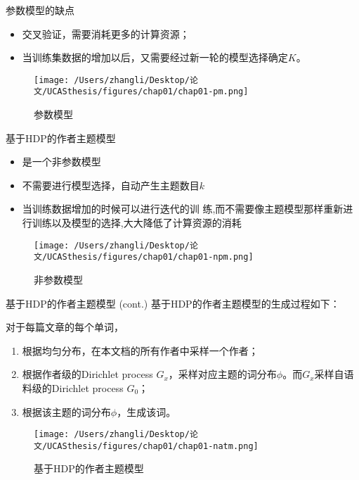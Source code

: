 \documentclass[presentation]{beamer}
\begin{document}
\begin{frame}[label={sec:orgheadline7}]{参数模型的缺点}
\begin{itemize}
\item 交叉验证，需要消耗更多的计算资源；
\item 当训练集数据的增加以后，又需要经过新一轮的模型选择确定\(K\)。
\end{itemize}
\begin{figure}[htb]
\centering
\texttt{[image: /Users/zhangli/Desktop/论文/UCASthesis/figures/chap01/chap01-pm.png]}
\caption{\label{fig:orgparagraph1}
参数模型}
\end{figure}
\end{frame}

\begin{frame}[label={sec:orgheadline8}]{基于HDP的作者主题模型}
\begin{itemize}
\item 是一个非参数模型
\item 不需要进行模型选择，自动产生主题数目\(k\)
\item 当训练数据增加的时候可以进行迭代的训 练,而不需要像主题模型那样重新进行训练以及模型的选择,大大降低了计算资源的消耗
\end{itemize}
\begin{figure}[htb]
\centering
\texttt{[image: /Users/zhangli/Desktop/论文/UCASthesis/figures/chap01/chap01-npm.png]}
\caption{\label{fig:orgparagraph2}
非参数模型}
\end{figure}
\end{frame}

\begin{frame}[label={sec:orgheadline9}]{基于HDP的作者主题模型 (cont.)}
基于HDP的作者主题模型的生成过程如下：

对于每篇文章的每个单词，
\begin{enumerate}
\item 根据均匀分布，在本文档的所有作者中采样一个作者；
\item 根据作者级的Dirichlet process \(G_x\)，采样对应主题的词分布\(\phi\)。而\(G_x\)采样自语料级的Dirichlet process \(G_0\)；
\item 根据该主题的词分布\(\phi\)，生成该词。
\end{enumerate}
\begin{figure}[htb]
\centering
\texttt{[image: /Users/zhangli/Desktop/论文/UCASthesis/figures/chap01/chap01-natm.png]}
\caption{\label{fig:orgparagraph3}
基于HDP的作者主题模型}
\end{figure}
\end{frame}
\end{document}
